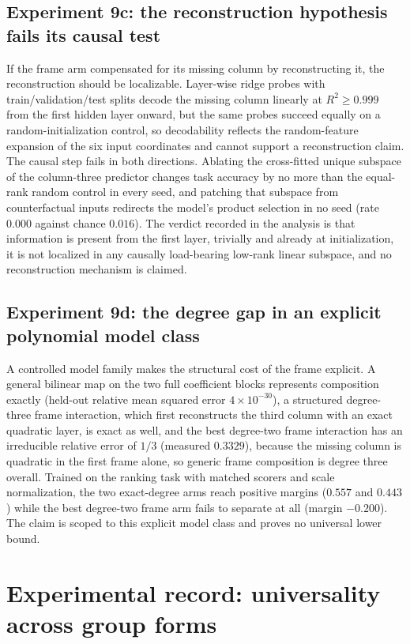 \documentclass{article}
\begin{document}
\subsection*{Experiment 9c: the reconstruction hypothesis fails its
causal test} If the frame arm compensated for its missing column by
reconstructing it, the reconstruction should be localizable. Layer-wise
ridge probes with train/validation/test splits decode the missing column
linearly at $R^2 \geq 0.999$ from the first hidden layer onward, but the
same probes succeed equally on a random-initialization control, so
decodability reflects the random-feature expansion of the six input
coordinates and cannot support a reconstruction claim. The causal step
fails in both directions. Ablating the cross-fitted unique subspace of
the column-three predictor changes task accuracy by no more than the
equal-rank random control in every seed, and patching that subspace from
counterfactual inputs redirects the model's product selection in no seed
(rate $0.000$ against chance $0.016$). The verdict recorded in the
analysis is that information is present from the first layer, trivially
and already at initialization, it is not localized in any causally
load-bearing low-rank linear subspace, and no reconstruction mechanism
is claimed.

\subsection*{Experiment 9d: the degree gap in an explicit polynomial
model class} A controlled model family makes the structural cost of the
frame explicit. A general bilinear map on the two full coefficient
blocks represents composition exactly (held-out relative mean squared
error $4 \times 10^{-30}$), a structured degree-three frame interaction,
which first reconstructs the third column with an exact quadratic layer,
is exact as well, and the best degree-two frame interaction has an
irreducible relative error of $1/3$ (measured $0.3329$), because the
missing column is quadratic in the first frame alone, so generic frame
composition is degree three overall. Trained on the ranking task with
matched scorers and scale normalization, the two exact-degree arms reach
positive margins ($0.557$ and $0.443$) while the best degree-two frame
arm fails to separate at all (margin $-0.200$). The claim is scoped to
this explicit model class and proves no universal lower bound.

\section{Experimental record: universality across group forms}
\label{app:universality-exps}
\end{document}
